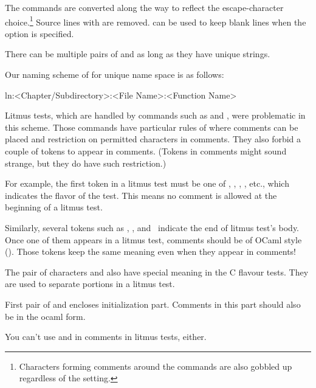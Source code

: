 The \qco{\\lnlbl} commands are converted along the way to reflect
the escape-character choice.\footnote{
	Characters forming comments around the \qco{\\lnlbl} commands
	are also gobbled up regardless of the  setting.
}
Source lines with \qco{\\fcvexclude} are removed.
\qco{\\fcvblank} can be used to keep blank lines when the
 option is specified.

There can be multiple pairs of  and 
as long as they have unique  strings.

Our naming scheme of  for unique name space is as follows:

\begin{VerbatimU}
ln:<Chapter/Subdirectory>:<File Name>:<Function Name>
\end{VerbatimU}

Litmus tests, which are handled by  commands such as
 and , were problematic in this scheme.
Those commands have particular rules of where comments can be
placed and restriction on permitted characters in comments.
They also forbid a couple of tokens to appear in comments.
(Tokens in comments might sound strange, but they do have such restriction.)

For example, the first token in a litmus test must be one of
, , , , etc., which indicates
the flavor of the test. This means no comment is allowed
at the beginning of a litmus test.

Similarly, several tokens such as , ,
and~ indicate the end of litmus test's body.
Once one of them appears in a litmus test, comments should be of
OCaml style (). Those tokens keep the same meaning
even when they appear in comments!

The pair of characters \qco{\{} and \qco{\}} also have special
meaning in the C flavour tests. They are used to separate portions
in a litmus test.

First pair of \qco{\{} and \qco{\}} encloses initialization part.
Comments in this part should also be in the ocaml form.

You can't use \qco{\{} and \qco{\}} in comments in litmus tests, either.

